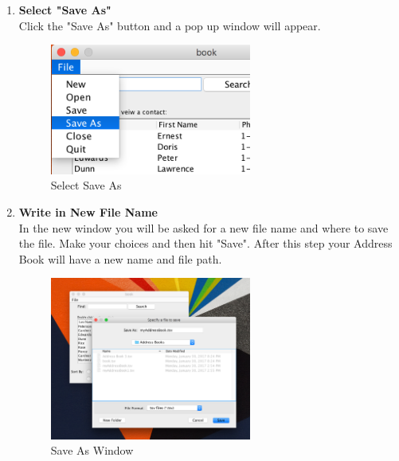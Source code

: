 \documentclass[a4paper, 11pt]{article}
\begin{document}
\begin{enumerate}[label=\textbf{\arabic*})]
    \clearpage
    
    \item{\textbf{Select "Save As"}}\\ Click the "Save As" button and a pop up window will appear.
    
    \begin{figure}[h!]
    \centering
      \includegraphics[width=250]{save_as_selection.png}
      \caption{Select Save As}
    \end{figure}
    
    \item{\textbf{Write in New File Name}}\\ In the new window you will be asked for a new file name and where to save the file. Make your choices and then hit "Save". After this step your Address Book will have a new name and file path.
    
    \begin{figure}[h!]
    \centering
      \includegraphics[width=250]{save_as_window.png}
      \caption{Save As Window}
    \end{figure}
\end{enumerate}
\end{document}
